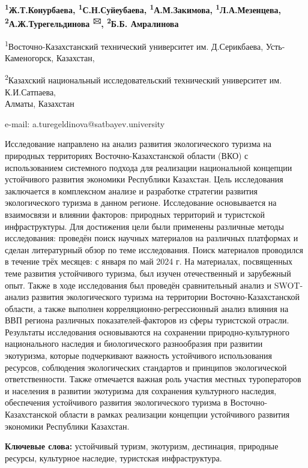 {\bfseries \textsuperscript{1}Ж.Т.Конурбаева,
\textsuperscript{1}С.Н.Суйеубаева, \textsuperscript{1}А.М.Закимова,
\textsuperscript{1}Л.А.Мезенцева,\\
\textsuperscript{2}А.Ж.Турегельдинова \textsuperscript{🖂},
\textsuperscript{2}Б.Б. Амралинова}

\textsuperscript{1}Восточно-Казахстанский технический университет им.
Д.Серикбаева, Усть-Каменогорск, Казахстан,

\textsuperscript{2}Казахский национальный исследовательский технический
университет им. К.И.Сатпаева,\\
Алматы, Казахстан

e-mail: a.turegeldinova@satbayev.university

Исследование направлено на анализ развития экологического туризма на
природных территориях Восточно-Казахстанской области (ВКО) с
использованием системного подхода для реализации национальной концепции
устойчивого развития экономики Республики Казахстан. Цель исследования
заключается в комплексном анализе и разработке стратегии развития
экологического туризма в данном регионе. Исследование основывается на
взаимосвязи и влиянии факторов: природных территорий и туристской
инфраструктуры. Для достижения цели были применены различные методы
исследования: проведён поиск научных материалов на различных платформах
и сделан литературный обзор по теме исследования. Поиск материалов
проводился в течение трёх месяцев: с января по май 2024 г. На
материалах, посвященных теме развития устойчивого туризма, был изучен
отечественный и зарубежный опыт. Также в ходе исследования был проведён
сравнительный анализ и SWOT-анализ развития экологического туризма на
территории Восточно-Казахстанской области, а также выполнен
корреляционно-регрессионный анализ влияния на ВВП региона различных
показателей-факторов из сферы туристской отрасли. Результаты
исследования основываются на сохранении природно-культурного
национального наследия и биологического разнообразия при развитии
экотуризма, которые подчеркивают важность устойчивого использования
ресурсов, соблюдения экологических стандартов и принципов экологической
ответственности. Также отмечается важная роль участия местных
туроператоров и населения в развитии экотуризма для сохранения
культурного наследия, обеспечения устойчивого развития экологического
туризма в Восточно-Казахстанской области в рамках реализации концепции
устойчивого развития экономики Республики Казахстан.

{\bfseries Ключевые слова:} устойчивый туризм, экотуризм, дестинация,
природные ресурсы, культурное наследие, туристская инфраструктура.

